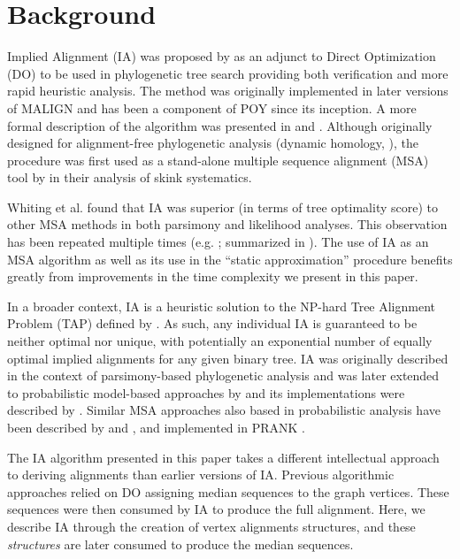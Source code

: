 \documentclass{bmcart}
\begin{document}
\section*{Background}

Implied Alignment (IA) was proposed by \cite{Wheeler2003} as an adjunct to Direct Optimization (DO) \citep{Wheeler1996,VaronandWheeler2012} to be used in phylogenetic tree search providing both verification and more rapid heuristic analysis.
The method was originally implemented in later versions of MALIGN \citep{Wheeler1991-1998} and has been a component of POY \citep{Wheeleretal2015, POY2, POY3, POY5, Wheeleretal2006} since its inception.
A more formal description of the algorithm was presented in \cite{Wheeleretal2006} and \cite{VaronandWheeler2012}.
Although originally designed for alignment-free phylogenetic analysis (dynamic homology, \citealp{Wheeler2001}), the procedure was first used as a stand-alone multiple sequence alignment (MSA) tool by \cite{WhitingAetal2006} in their analysis of skink systematics.

Whiting et al. found that IA was superior (in terms of tree optimality score) to other MSA methods in both parsimony and likelihood analyses.
This observation has been repeated multiple times (e.g. \citealp{LindgrenandDaly2007, Lehtonen2008, WheelerandGiribet2009, FordandWheeler2015}; summarized in \citealp{Wheeler2012}).
The use of IA as an MSA algorithm as well as its use in the ``static approximation'' procedure \citep{Wheeler2003b} benefits greatly from improvements in the time complexity we present in this paper.

In a broader context, IA is a heuristic solution to the NP-hard Tree Alignment Problem (TAP) defined by \cite{sankoff1975}.
As such, any individual IA is guaranteed to be neither optimal nor unique, with potentially an exponential number of equally optimal implied alignments for any given binary tree.
IA was originally described in the context of parsimony-based phylogenetic analysis and was later extended to probabilistic model-based approaches by \cite{Wheeler2006} and its implementations were described by \citep{Varonetal2010,Wheeleretal2015}.
Similar MSA approaches also based in probabilistic analysis have been described by \cite{LoytynojaandGoldman2008} and \cite{Loytynojaetal2010}, and implemented in PRANK \citep{PRANK}.

The IA algorithm presented in this paper takes a different intellectual approach to deriving alignments than earlier versions of IA.
Previous algorithmic approaches relied on DO assigning median sequences to the graph vertices. These sequences were then consumed by IA to produce the full alignment.
Here, we describe IA through the creation of vertex alignments structures, and these \textit{structures} are later consumed to produce the median sequences.
\end{document}
